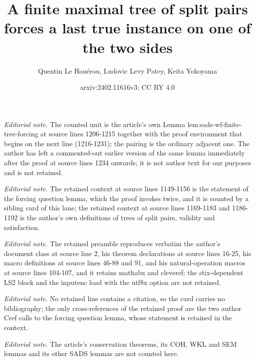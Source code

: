 \documentclass{article}
\title{A finite maximal tree of split pairs forces a last true instance on one of the two sides}
\author{Quentin Le Houérou, Ludovic Levy Patey, Keita Yokoyama}
\date{arxiv:2402.11616v3; CC BY 4.0}
\numberwithin{theorem}{section}
\begin{document}
\maketitle
\noindent\textit{Editorial note.} The counted unit is the article's own Lemma lem:sads-wf-finite-tree-forcing at source lines 1206-1215 together with the proof environment that begins on the next line (1216-1231); the pairing is the ordinary adjacent one. The author has left a commented-out earlier version of the same lemma immediately after the proof at source lines 1234 onwards; it is not author text for our purposes and is not retained.\par\medskip
\noindent\textit{Editorial note.} The retained context at source lines 1149-1156 is the statement of the forcing question lemma, which the proof invokes twice, and it is counted by a sibling card of this lane; the retained context at source lines 1169-1183 and 1186-1192 is the author's own definitions of trees of split pairs, validity and satisfaction.\par\medskip
\noindent\textit{Editorial note.} The retained preamble reproduces verbatim the author's document class at source line 2, his theorem declarations at source lines 16-25, his macro definitions at source lines 46-88 and 91, and his natural-operation macros at source lines 104-107, and it retains mathabx and cleveref; the stix-dependent LS2 block and the inputenc load with the utf8x option are not retained.\par\medskip
\noindent\textit{Editorial note.} No retained line contains a citation, so the card carries no bibliography; the only cross-references of the retained proof are the two author Cref calls to the forcing question lemma, whose statement is retained in the context.\par\medskip
\noindent\textit{Editorial note.} The article's conservation theorems, its COH, WKL and SEM lemmas and its other SADS lemmas are not counted here.\par\medskip
\end{document}
